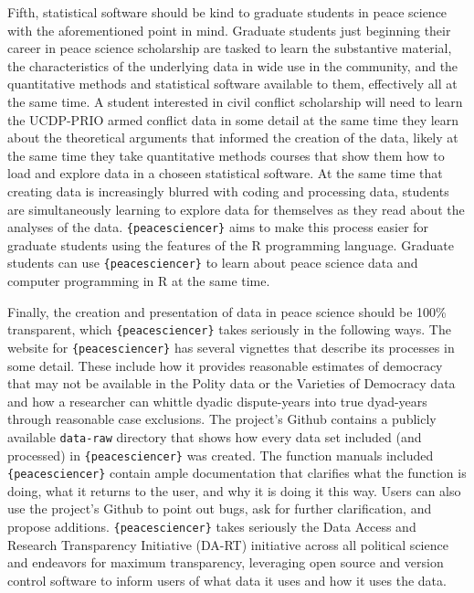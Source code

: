 \documentclass[
  11pt,
]{article}
\begin{document}
Fifth, statistical software should be kind to graduate students in peace science with the aforementioned point in mind. Graduate students just beginning their career in peace science scholarship are tasked to learn the substantive material, the characteristics of the underlying data in wide use in the community, and the quantitative methods and statistical software available to them, effectively all at the same time. A student interested in civil conflict scholarship will need to learn the UCDP-PRIO armed conflict data in some detail at the same time they learn about the theoretical arguments that informed the creation of the data, likely at the same time they take quantitative methods courses that show them how to load and explore data in a choseen statistical software. At the same time that creating data is increasingly blurred with coding and processing data, students are simultaneously learning to explore data for themselves as they read about the analyses of the data. \texttt{\{peacesciencer\}} aims to make this process easier for graduate students using the features of the R programming language. Graduate students can use \texttt{\{peacesciencer\}} to learn about peace science data and computer programming in R at the same time.

Finally, the creation and presentation of data in peace science should be 100\% transparent, which \texttt{\{peacesciencer\}} takes seriously in the following ways. The website for \texttt{\{peacesciencer\}} has several vignettes that describe its processes in some detail. These include how it provides reasonable estimates of democracy that may not be available in the Polity data or the Varieties of Democracy data and how a researcher can whittle dyadic dispute-years into true dyad-years through reasonable case exclusions. The project's Github contains a publicly available \texttt{data-raw} directory that shows how every data set included (and processed) in \texttt{\{peacesciencer\}} was created. The function manuals included \texttt{\{peacesciencer\}} contain ample documentation that clarifies what the function is doing, what it returns to the user, and why it is doing it this way. Users can also use the project's Github to point out bugs, ask for further clarification, and propose additions. \texttt{\{peacesciencer\}} takes seriously the Data Access and Research Transparency Initiative (DA-RT) initiative across all political science and endeavors for maximum transparency, leveraging open source and version control software to inform users of what data it uses and how it uses the data.
\end{document}
